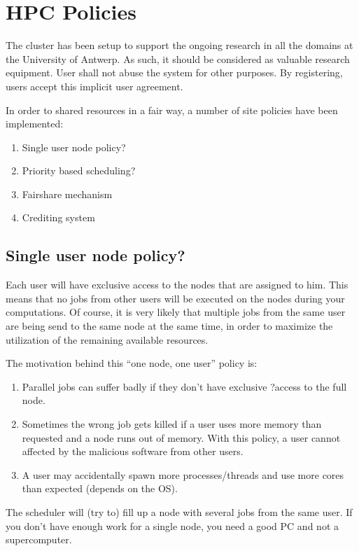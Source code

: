 \chapter{HPC Policies}

The cluster has been setup to support the ongoing research in all the domains at the University of Antwerp.  As such, it should be considered as valuable research equipment.  User shall not abuse the system for other purposes. By registering, users accept this implicit user agreement.

In order to shared resources in a fair way, a number of site policies have been implemented:

\begin{enumerate}
\item  Single user node policy?
\item  Priority based scheduling?
\item  Fairshare mechanism
\item  Crediting system
\end{enumerate}

\section{Single user node policy?}

Each user will have exclusive access to the nodes that are assigned to him. This means that no jobs from other users will be executed on the nodes during your computations.  Of course, it is very likely that multiple jobs from the same user are being send to the same node at the same time, in order to maximize the utilization of the remaining available resources.

The motivation behind this ``one node, one user'' policy is:

\begin{enumerate}
\item  Parallel jobs can suffer badly if they don't have exclusive ?access to the full node.
\item  Sometimes the wrong job gets killed if a user uses more memory than requested and a node runs out of memory.  With this policy, a user cannot affected by the malicious software from other users.
\item  A user may accidentally spawn more processes/threads and use more cores than expected (depends on the OS).
\end{enumerate}

The scheduler will (try to) fill up a node with several jobs from the same user. If you don't have enough work for a single node, you need a good PC and not a supercomputer.

